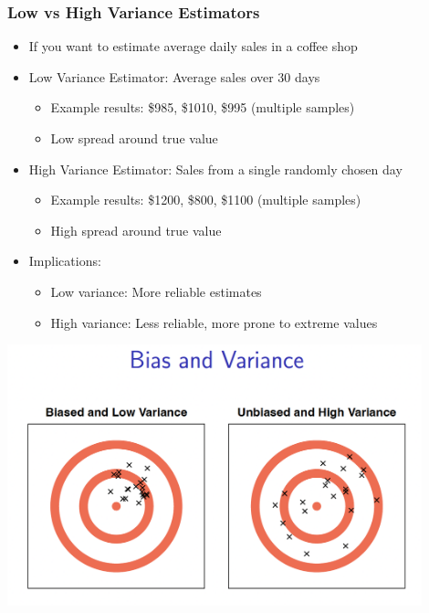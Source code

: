 \documentclass[12pt]{beamer}
\begin{document}
\begin{frame}
	\frametitle{Low vs High Variance Estimators}
	
	\begin{itemize}[label={\color{blue}$\blacktriangleright$}]
		\item If you want to estimate average daily sales in a coffee shop
		
		\item Low Variance Estimator: Average sales over 30 days
		\begin{itemize}
			\item Example results: \$985, \$1010, \$995 (multiple samples)
			\item Low spread around true value
		\end{itemize}
		
		\item High Variance Estimator: Sales from a single randomly chosen day
		\begin{itemize}
			\item Example results: \$1200, \$800, \$1100 (multiple samples)
			\item High spread around true value
		\end{itemize}
		
		\item Implications:
		\begin{itemize}
			\item Low variance: More reliable estimates
			\item High variance: Less reliable, more prone to extreme values
		\end{itemize}
	\end{itemize}
	
\end{frame}
\begin{frame}
	\includegraphics[width=12cm]{bv.png}
\end{frame}
\end{document}
